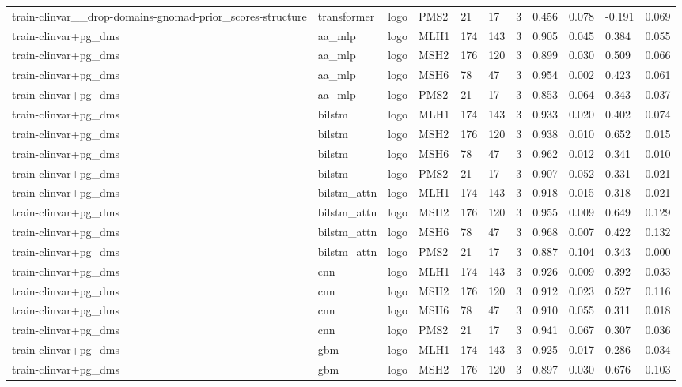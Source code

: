 \begin{table}[t]
\begin{tabular}{lllllllllll}
train-clinvar\_\_drop-domains-gnomad-prior\_scores-structure & transformer & logo & PMS2 & 21 & 17 & 3 & 0.456 & 0.078 & -0.191 & 0.069 \\
train-clinvar+pg\_dms & aa\_mlp & logo & MLH1 & 174 & 143 & 3 & 0.905 & 0.045 & 0.384 & 0.055 \\
train-clinvar+pg\_dms & aa\_mlp & logo & MSH2 & 176 & 120 & 3 & 0.899 & 0.030 & 0.509 & 0.066 \\
train-clinvar+pg\_dms & aa\_mlp & logo & MSH6 & 78 & 47 & 3 & 0.954 & 0.002 & 0.423 & 0.061 \\
train-clinvar+pg\_dms & aa\_mlp & logo & PMS2 & 21 & 17 & 3 & 0.853 & 0.064 & 0.343 & 0.037 \\
train-clinvar+pg\_dms & bilstm & logo & MLH1 & 174 & 143 & 3 & 0.933 & 0.020 & 0.402 & 0.074 \\
train-clinvar+pg\_dms & bilstm & logo & MSH2 & 176 & 120 & 3 & 0.938 & 0.010 & 0.652 & 0.015 \\
train-clinvar+pg\_dms & bilstm & logo & MSH6 & 78 & 47 & 3 & 0.962 & 0.012 & 0.341 & 0.010 \\
train-clinvar+pg\_dms & bilstm & logo & PMS2 & 21 & 17 & 3 & 0.907 & 0.052 & 0.331 & 0.021 \\
train-clinvar+pg\_dms & bilstm\_attn & logo & MLH1 & 174 & 143 & 3 & 0.918 & 0.015 & 0.318 & 0.021 \\
train-clinvar+pg\_dms & bilstm\_attn & logo & MSH2 & 176 & 120 & 3 & 0.955 & 0.009 & 0.649 & 0.129 \\
train-clinvar+pg\_dms & bilstm\_attn & logo & MSH6 & 78 & 47 & 3 & 0.968 & 0.007 & 0.422 & 0.132 \\
train-clinvar+pg\_dms & bilstm\_attn & logo & PMS2 & 21 & 17 & 3 & 0.887 & 0.104 & 0.343 & 0.000 \\
train-clinvar+pg\_dms & cnn & logo & MLH1 & 174 & 143 & 3 & 0.926 & 0.009 & 0.392 & 0.033 \\
train-clinvar+pg\_dms & cnn & logo & MSH2 & 176 & 120 & 3 & 0.912 & 0.023 & 0.527 & 0.116 \\
train-clinvar+pg\_dms & cnn & logo & MSH6 & 78 & 47 & 3 & 0.910 & 0.055 & 0.311 & 0.018 \\
train-clinvar+pg\_dms & cnn & logo & PMS2 & 21 & 17 & 3 & 0.941 & 0.067 & 0.307 & 0.036 \\
train-clinvar+pg\_dms & gbm & logo & MLH1 & 174 & 143 & 3 & 0.925 & 0.017 & 0.286 & 0.034 \\
train-clinvar+pg\_dms & gbm & logo & MSH2 & 176 & 120 & 3 & 0.897 & 0.030 & 0.676 & 0.103 \\

\end{tabular}
\end{table}
